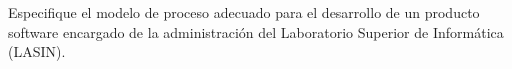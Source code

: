 Especifique el modelo de proceso adecuado para el desarrollo de un producto software encargado de la administración del Laboratorio Superior de Informática (LASIN).
